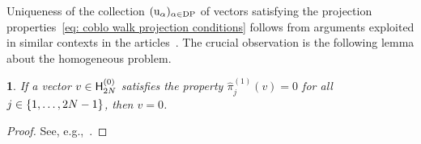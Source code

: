 \documentclass[oneside,english]{amsart}
\numberwithin{equation}{section}
\numberwithin{figure}{section}
\theoremstyle{plain}
\theoremstyle{plain}
\theoremstyle{plain}
\newtheorem{lem}{\protect\lemmaname}
\theoremstyle{remark}
\theoremstyle{plain}
\theoremstyle{plain}
\theoremstyle{plain}
\theoremstyle{plain}
\theoremstyle{plain}
\theoremstyle{plain}
\theoremstyle{plain}
\theoremstyle{plain}
\providecommand{\lemmaname}{Lemma}
\newcommand{\red}[1]{{\color{red} #1}}
\begin{document}
Uniqueness of the collection
$( \mathrm{u}_\alpha )_{\alpha \in \mathrm{DP}}$ 
of vectors satisfying the projection properties~\eqref{eq: coblo walk projection conditions}
follows from arguments exploited in similar contexts in
the articles~\cite{KP-pure_partition_functions_of_multiple_SLEs,
P-basis_for_solutions_of_BSA_PDEs}.
The crucial observation is the following lemma about the homogeneous problem.

\begin{lem}
\label{lem: all projections vanish}
If a vector $v \in \mathsf{H}_{2N}^{(0)}$ 
satisfies the property
$\hat{\pi}_{j}^{(1)}(v) = 0$ for all $j \in \left\{ 1,\ldots,2N-1\right\}$, then $v = 0$.  
\end{lem}

\begin{proof}
See, e.g.,~\cite[Corollary~2.5]{KP-pure_partition_functions_of_multiple_SLEs}. 
\end{proof}
\end{document}
